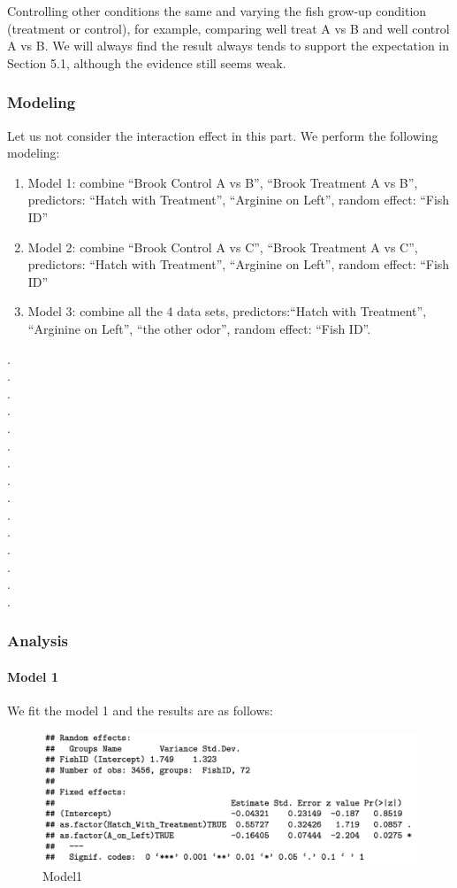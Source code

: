 \documentclass{article}
\begin{document}
	Controlling other conditions the same and varying the fish grow-up condition (treatment or control), for example, comparing well treat A vs B and well control A vs B. We will always find the result always tends to support the expectation in Section 5.1, although the evidence still seems weak.
	
	\subsubsection{Modeling}
	Let us not consider the interaction effect in this part. We perform the following modeling:
	\begin{enumerate}
		\item Model 1: combine “Brook Control A vs B”, “Brook Treatment A vs B”, predictors: “Hatch with Treatment”, “Arginine on Left”, random effect: “Fish ID”
		\item Model 2: combine “Brook Control A vs C”, “Brook Treatment A vs C”, predictors: “Hatch with Treatment”, “Arginine on Left”, random effect: “Fish ID”
		\item Model 3: combine all the 4 data sets, predictors:“Hatch with Treatment”, “Arginine on Left”, “the other odor”, random effect: “Fish ID”.
	\end{enumerate}
	.\\
	.\\
	.\\
	.\\
	.\\
	.\\
	.\\
	.\\
	.\\
	.\\
	.\\
	.\\
	.\\
	.\\
	.\\
	\subsubsection{Analysis}
	\paragraph{Model 1}
	We fit the model 1 and the results are as follows:
	\begin{figure}[h]
		\centering
		\includegraphics[width=1\textwidth]{Salmonmodel1}
		\caption{Model1}
	\end{figure}
	
\end{document}
